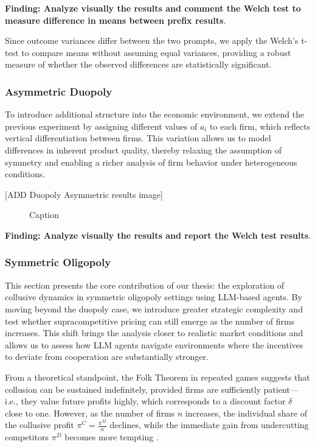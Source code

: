 \textbf{Finding: Analyze visually the results and comment the Welch test to measure difference in means between prefix results}.

Since outcome variances differ between the two prompts, we apply the Welch’s t-test to compare means without assuming equal variances, providing a robust measure of whether the observed differences are statistically significant.

\subsubsection*{Asymmetric Duopoly}

To introduce additional structure into the economic environment, we extend the previous experiment by assigning different values of $a_i$ to each firm, which reflects vertical differentiation between firms. This variation allows us to model differences in inherent product quality, thereby relaxing the assumption of symmetry and enabling a richer analysis of firm behavior under heterogeneous conditions.


[ADD Duopoly Asymmetric results image]
\begin{figure}[H]
    \centering
    \caption{Caption}
    \label{fig:enter-label}
\end{figure}
\textbf{Finding: Analyze visually the results and report the Welch test results}.



\subsubsection*{Symmetric Oligopoly}

This section presents the core contribution of our thesis: the exploration of collusive dynamics in symmetric oligopoly settings using LLM-based agents. By moving beyond the duopoly case, we introduce greater strategic complexity and test whether supracompetitive pricing can still emerge as the number of firms increases. This shift brings the analysis closer to realistic market conditions and allows us to assess how LLM agents navigate environments where the incentives to deviate from cooperation are substantially stronger.

From a theoretical standpoint, the Folk Theorem in repeated games suggests that collusion can be sustained indefinitely, provided firms are sufficiently patient—i.e., they value future profits highly, which corresponds to a discount factor $\delta$ close to one. However, as the number of firms $n$ increases, the individual share of the collusive profit $\pi^C = \frac{\pi^M}{n}$ declines, while the immediate gain from undercutting competitors $\pi^D$ becomes more tempting \parencite{ivaldi_chapter_2007, tirole_theory_1988}.

